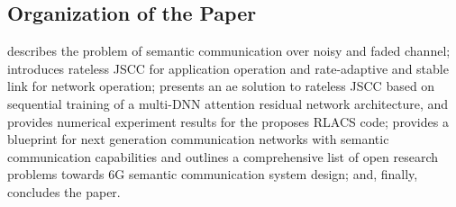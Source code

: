 \subsection{Organization of the Paper} 

 describes the problem of semantic communication over noisy and faded channel;  introduces rateless JSCC for application operation and rate-adaptive and stable link for network operation;  presents an \gls{ae} solution to rateless JSCC based on sequential training of a multi-DNN attention residual network architecture, and provides  numerical experiment results for the proposes RLACS code;  provides a blueprint for next generation communication networks with semantic communication capabilities and outlines a comprehensive list of open research problems towards 6G semantic communication system design; and, finally,  concludes the paper.



